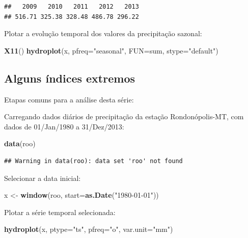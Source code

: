 \documentclass[
]{book}
\newenvironment{Shaded}{\begin{snugshade}}{\end{snugshade}}
\newcommand{\DataTypeTok}[1]{\textcolor[rgb]{0.13,0.29,0.53}{#1}}
\newcommand{\KeywordTok}[1]{\textcolor[rgb]{0.13,0.29,0.53}{\textbf{#1}}}
\newcommand{\NormalTok}[1]{#1}
\newcommand{\StringTok}[1]{\textcolor[rgb]{0.31,0.60,0.02}{#1}}
\begin{document}
\begin{verbatim}
##   2009   2010   2011   2012   2013 
## 516.71 325.38 328.48 486.78 296.22
\end{verbatim}

Plotar a evolução temporal dos valores da precipitação sazonal:

\begin{Shaded}
\begin{Highlighting}[]
\KeywordTok{X11}\NormalTok{()}
\KeywordTok{hydroplot}\NormalTok{(x, }\DataTypeTok{pfreq=}\StringTok{"seasonal"}\NormalTok{, }\DataTypeTok{FUN=}\NormalTok{sum, }\DataTypeTok{stype=}\StringTok{"default"}\NormalTok{)}
\end{Highlighting}
\end{Shaded}

\hypertarget{alguns-uxedndices-extremos}{%
\subsection{Alguns índices extremos}\label{alguns-uxedndices-extremos}}

Etapas comuns para a análise desta série:

Carregando dados diários de precipitação da estação Rondonópolis-MT, com dados de 01/Jan/1980 a 31/Dez/2013:

\begin{Shaded}
\begin{Highlighting}[]
\KeywordTok{data}\NormalTok{(roo)}
\end{Highlighting}
\end{Shaded}

\begin{verbatim}
## Warning in data(roo): data set 'roo' not found
\end{verbatim}

Selecionar a data inicial:

\begin{Shaded}
\begin{Highlighting}[]
\NormalTok{x <-}\StringTok{ }\KeywordTok{window}\NormalTok{(roo, }\DataTypeTok{start=}\KeywordTok{as.Date}\NormalTok{(}\StringTok{"1980-01-01"}\NormalTok{))}
\end{Highlighting}
\end{Shaded}

Plotar a série temporal selecionada:

\begin{Shaded}
\begin{Highlighting}[]
\KeywordTok{hydroplot}\NormalTok{(x, }\DataTypeTok{ptype=}\StringTok{"ts"}\NormalTok{, }\DataTypeTok{pfreq=}\StringTok{"o"}\NormalTok{, }\DataTypeTok{var.unit=}\StringTok{"mm"}\NormalTok{)}
\end{Highlighting}
\end{Shaded}
\end{document}
